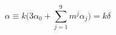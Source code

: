 \begin{equation}
\alpha \equiv k \Big( 3 \alpha_0 + \sum_{j=1}^9 m^j \alpha_j \Big) = k \delta
\end{equation}

